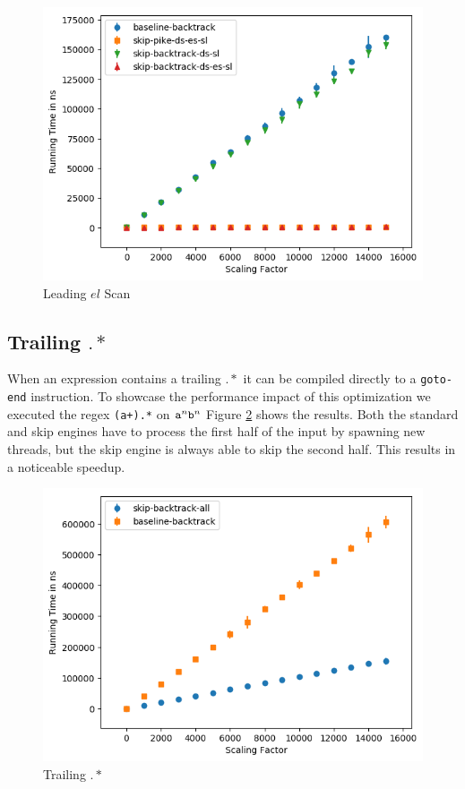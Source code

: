 
\begin{figure}
\caption{Leading $el$ Scan}
\label{fig:leading:noncontaining:estar}

\includegraphics{resources/leading-noncontaining-estar.png}
\end{figure}

\subsection{Trailing $.*$}

When an expression contains a trailing $.*$ it can be compiled
directly to a \verb'goto-end' instruction. To showcase the
performance impact of this optimization we executed the
regex \verb'(a+).*' on ${\tt a}^n{\tt b}^n$
Figure \ref{fig:aplus:trailing} shows the results. Both the standard
and skip engines have to process the first half of the input
by spawning new threads, but the skip engine is always able
to skip the second half. This results in a noticeable speedup.

\begin{figure}
\caption{Trailing $.*$}
\label{fig:aplus:trailing}

\includegraphics{resources/aplus-trailing.png}
\end{figure}

